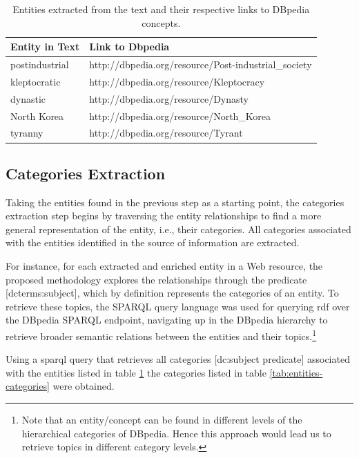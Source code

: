 \begin{table}[H]
\centering
\caption{Entities extracted from the text and their respective links to DBpedia concepts.}
\label{tab:example-entities}
\begin{tabular}{@{}ll@{}}
\toprule
Entity in Text & Link to Dbpedia                                  \\ \midrule
postindustrial & http://dbpedia.org/resource/Post-industrial\_society \\
kleptocratic   & http://dbpedia.org/resource/Kleptocracy              \\
dynastic       & http://dbpedia.org/resource/Dynasty                  \\
North Korea    & http://dbpedia.org/resource/North\_Korea             \\
tyranny        & http://dbpedia.org/resource/Tyrant                   \\ \bottomrule
\end{tabular}
\end{table}


\subsection{\hspace*{3pt}  Categories Extraction}
\label{sec:categories-extraction}
Taking the entities found in the previous step as a starting point, the categories extraction step begins by traversing the entity relationships to find a more general representation of the entity, i.e., their categories. All categories associated with the entities identified in the source of information are extracted. 

For instance, for each extracted and enriched entity in a Web resource, the proposed methodology explores the relationships through the predicate [dcterms:subject], which by definition represents the categories of an entity. To retrieve these topics, the SPARQL query language was used for querying  \gls{rdf} over the DBpedia SPARQL endpoint, navigating up in the DBpedia hierarchy to retrieve broader semantic relations between the entities and their topics.\footnote{Note that an entity/concept can be found in different levels of the hierarchical categories of DBpedia. Hence this approach would lead us to retrieve topics in different category levels.}

Using a \gls{sparql} query that retrieves all categories [dc:subject predicate] associated with the entities listed in table \ref{tab:example-entities} the categories listed in table \ref{tab:entities-categories} were obtained.


